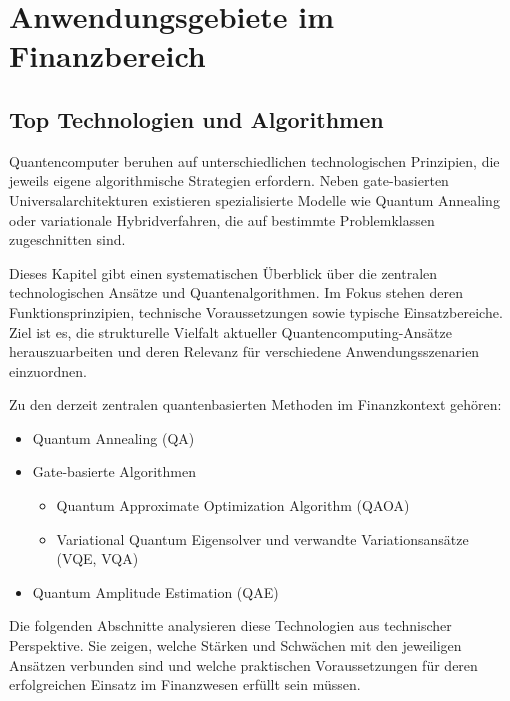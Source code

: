 \chapter{Anwendungsgebiete im Finanzbereich}
\label{trends} %


\section{Top Technologien und Algorithmen}

Quantencomputer beruhen auf unterschiedlichen technologischen Prinzipien, die jeweils eigene algorithmische Strategien erfordern. Neben gate-basierten Universalarchitekturen existieren spezialisierte Modelle wie Quantum Annealing oder variationale Hybridverfahren, die auf bestimmte Problemklassen zugeschnitten sind.

Dieses Kapitel gibt einen systematischen Überblick über die zentralen technologischen Ansätze und Quantenalgorithmen. Im Fokus stehen deren Funktionsprinzipien, technische Voraussetzungen sowie typische Einsatzbereiche. Ziel ist es, die strukturelle Vielfalt aktueller Quantencomputing-Ansätze herauszuarbeiten und deren Relevanz für verschiedene Anwendungsszenarien einzuordnen.

Zu den derzeit zentralen quantenbasierten Methoden im Finanzkontext gehören:

\begin{itemize}
  \item Quantum Annealing (QA)
  \item Gate-basierte Algorithmen
    \begin{itemize}
      \item Quantum Approximate Optimization Algorithm (QAOA)
      \item Variational Quantum Eigensolver und verwandte Variationsansätze (VQE, VQA)
    \end{itemize}
  \item Quantum Amplitude Estimation (QAE)
\end{itemize}

Die folgenden Abschnitte analysieren diese Technologien aus technischer Perspektive. Sie zeigen, welche Stärken und Schwächen mit den jeweiligen Ansätzen verbunden sind und welche praktischen Voraussetzungen für deren erfolgreichen Einsatz im Finanzwesen erfüllt sein müssen.

